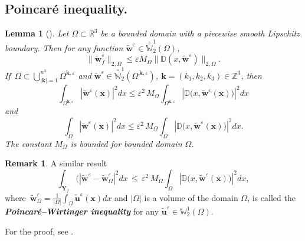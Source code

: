\documentclass{article}
\theoremstyle{plain}
\newtheorem{lemma}[theorem]{Lemma}
\theoremstyle{definition}
\newtheorem{remark}[theorem]{Remark}
\numberwithin{equation}{section}
\begin{document}
\subsection{Poincar\'{e} inequality.}

\begin{lemma}[\cite{19}]\label{l2.6}
Let $\Omega\subset\mathbb{R}^{3}$ be a bounded domain with a piecewise smooth
Lipschitz boundary. Then for any function
$\widetilde{\boldsymbol{w}}^{\varepsilon}\in\stackrel{\!\!\circ}{\mathbb{W}}^{1}_{2}(\Omega)$,
\begin{equation*}
\|\widetilde{\boldsymbol{w}}^{\varepsilon}_{f}\|_{2,\Omega}
\leqslant\varepsilon{M}_{\Omega}
\|\mathbb{D}(x,\widetilde{\boldsymbol{w}}^{\varepsilon})\|_{2,\Omega}.
\end{equation*}
If $\displaystyle\,\Omega\subset\bigcup_{|\boldsymbol{k}|=1}^{n^{3}}\Omega^{\boldsymbol{k},\varepsilon}$
and $\widetilde{\boldsymbol{w}}^{\varepsilon}\in\stackrel{\!\!\circ}{\mathbb{W}}^{1}_{2}
(\Omega^{\,\boldsymbol{k},\varepsilon})$,
$\boldsymbol{k}=(k_{1},k_{2},k_{3})\in\mathbb{Z}^{3}$, then
\begin{equation*}
\int_{\Omega^{\boldsymbol{k},\varepsilon}}
|\widetilde{\boldsymbol{w}}^{\varepsilon}(\boldsymbol{x})|^{2}dx
\leqslant\varepsilon^{2}\,M_{\Omega}
\int_{\Omega^{\boldsymbol{k},\varepsilon}}
|\mathbb{D}\big(x,\widetilde{\boldsymbol{w}}^{\varepsilon}(\boldsymbol{x})\big)|^{2}dx
\end{equation*}
and
\begin{equation}\label{eq2.7}
\int_{\Omega}|\widetilde{\boldsymbol{w}}^{\varepsilon}(\boldsymbol{x})|^{2}dx
\leqslant\varepsilon^{2}\,M_{\Omega}\int_{\Omega}
|\mathbb{D}\big(x,\widetilde{\boldsymbol{w}}^{\varepsilon}(\boldsymbol{x})\big)|^{2}dx.
\end{equation}
The constant $M_{\Omega}$ is bounded for bounded domain $\Omega$.
\end{lemma}

\begin{remark}\label{2.7}
A similar result
\begin{equation*}
\int_{\textbf{Y}_{f}}(|\widetilde{\boldsymbol{w}}^{\varepsilon}-
\widetilde{\boldsymbol{w}}^{\varepsilon}_{\Omega}|^{2}dx\,\leqslant\,\varepsilon^{2}\,M_{\Omega}
\int_{\Omega}|\mathbb{D}
\big(x,\widetilde{\boldsymbol{w}}^{\varepsilon}(\boldsymbol{x})\big)|^{2}dx,
\end{equation*}
where $\displaystyle\,\widetilde{\boldsymbol{w}}^{\varepsilon}_{\Omega}=
\frac{1}{|\Omega|}\int_{\Omega}\widetilde{\boldsymbol{u}}^{\varepsilon}(\boldsymbol{x})dx$ and $|\Omega|$
is a volume of the domain $\Omega$, is called the \textbf{\emph{Poincar\'{e}--Wirtinger inequality}} for any $\widetilde{\boldsymbol{u}}^{\varepsilon}\in\mathbb{W}^{1}_{2}(\Omega)$.

For the proof, see \cite{8}.
\end{remark}
\end{document}

